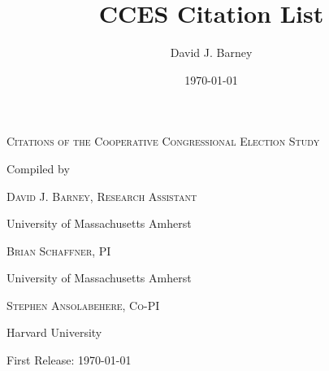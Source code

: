 \documentclass[12pt, letterpaper]{article}
\title{CCES Citation List}
\author{David J. Barney}
\date{\today}
\begin{document}
\begin{titlepage}
	\centering
	{\scshape\LARGE Citations of the Cooperative Congressional Election Study \par}
	\vspace{3cm}
	{Compiled by}
	{\scshape\Large David J. Barney, Research Assistant\par}
	{University of Massachusetts Amherst\par}
	\vspace{3cm}
	{\scshape\Large Brian Schaffner, PI\par}
	{University of Massachusetts Amherst}\\
	\vspace{1cm}
	{\scshape\Large Stephen Ansolabehere, Co-PI\par}
	{Harvard University\par}
	
	
	\vfill

	{\large First Release: \today\par}
\end{titlepage}
\nocite{*}







\end{document}
